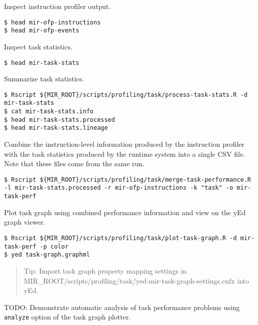\documentclass[11pt,a4paper]{article}
\begin{document}
Inspect instruction profiler output.

\begin{lstlisting}[style=MyInputStyle]
$ head mir-ofp-instructions
$ head mir-ofp-events
\end{lstlisting}

Inspect task statistics.

\begin{lstlisting}[style=MyInputStyle]
$ head mir-task-stats
\end{lstlisting}

Summarize task statistics.

\begin{lstlisting}[style=MyInputStyle]
$ Rscript ${MIR_ROOT}/scripts/profiling/task/process-task-stats.R -d mir-task-stats
$ cat mir-task-stats.info
$ head mir-task-stats.processed
$ head mir-task-stats.lineage
\end{lstlisting}

Combine the instruction-level information produced by the instruction profiler with the task statistics produced by the runtime system into a single CSV file. Note that these files come from the same run.

\begin{lstlisting}[style=MyInputStyle]
$ Rscript ${MIR_ROOT}/scripts/profiling/task/merge-task-performance.R -l mir-task-stats.processed -r mir-ofp-instructions -k "task" -o mir-task-perf
\end{lstlisting}

Plot task graph using combined performance information and view on the yEd graph viewer.

\begin{lstlisting}[style=MyInputStyle]
$ Rscript ${MIR_ROOT}/scripts/profiling/task/plot-task-graph.R -d mir-task-perf -p color
$ yed task-graph.graphml
\end{lstlisting}

\begin{framed}
\begin{quote}
Tip: Import task graph property mapping settings in MIR\_ROOT/scripts/profiling/task/yed-mir-task-graph-settings.cnfx into yEd.
\end{quote}
\end{framed}

TODO: Demonstrate automatic analysis of task performance problems using \texttt{analyze} option of the task graph plotter.
\end{document}
